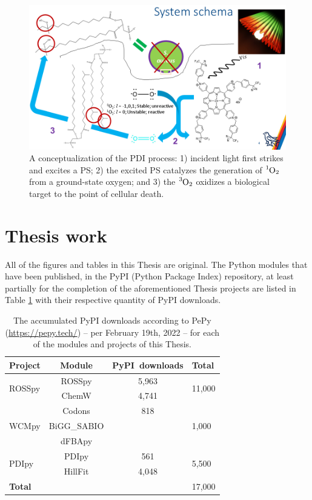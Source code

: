 \begin{figure}[h]
    \centering
    \includegraphics[width = \textwidth]{images/Introduction/PDI_workflow.png}
    \caption{
        A conceptualization of the PDI process: 1) incident light first strikes and excites a PS; 2) the excited PS catalyzes the generation of $\ce{^1O_2}$ from a ground-state oxygen; and 3) the $\ce{^3O_2}$ oxidizes a biological target to the point of cellular death.   
    }
    \label{PDI_workflow}
\end{figure}

\section{Thesis work}
All of the figures and tables in this Thesis are original. The Python modules that have been published, in the PyPI (Python Package Index) repository, at least partially for the completion of the aforementioned Thesis projects are listed in Table \ref{downloads} with their respective quantity of PyPI downloads.

\begin{table}[h]
    \centering
    \begin{tabular}{l|c|c|l}
        \textbf{Project} & \textbf{Module} & \textbf{PyPI~downloads} & \textbf{Total}\\
        \toprule
        \multirow{2}{2mm}{ROSSpy} & ROSSpy & 5,963 & \multirow{2}{2mm}{11,000}\\
         & ChemW & 4,741 & \\
         \hline
        \multirow{3}{2mm}{WCMpy} & Codons & 818 & \multirow{3}{2mm}{1,000}\\
         & BiGG\_SABIO & & \\
         & dFBApy & & \\
         \hline
        \multirow{2}{2mm}{PDIpy} & PDIpy & 561 & \multirow{2}{2mm}{5,500}\\
         & HillFit & 4,048 & \\
         \hline
         \textbf{Total} &  &  & 17,000 \\
         \bottomrule
    \end{tabular}
    \caption{
        The accumulated PyPI downloads according to PePy (\url{https://pepy.tech/}) -- per February 19th, 2022 -- for each of the modules and projects of this Thesis. 
    }
    \label{downloads}
\end{table}


